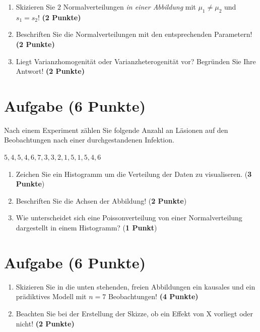 \documentclass[a4paper, 10pt]{scrartcl}\usepackage[]{graphicx}\usepackage[]{color}
\begin{document}
\begin{enumerate}
\item Skizieren Sie $2$ Normalverteilungen \textit{in einer
    Abbildung} mit $\mu_1 \neq \mu_2$ und $s_1 = s_2$! \textbf{(2 Punkte)}
\item Beschriften Sie die Normalverteilungen mit den entsprechenden
  Parametern! \textbf{(2 Punkte)}
\item Liegt Varianzhomogenit{\"a}t oder Varianzheterogenit{\"a}t vor? Begr{\"u}nden Sie
  Ihre Antwort! \textbf{(2 Punkte)}
\end{enumerate}

 
\clearpage

\section{Aufgabe \hfill (6 Punkte)}



Nach einem Experiment zählen Sie folgende Anzahl an Läsionen auf den Beobachtungen nach einer durchgestandenen Infektion. 

\begin{center}
$5, 4, 5, 4, 6, 7, 3, 3, 2, 1, 5, 1, 5, 4, 6$
\end{center}

\begin{enumerate}
\item Zeichen Sie ein Histogramm um die Verteilung der Daten zu visualiseren. (\textbf{3 Punkte})
\item Beschriften Sie die Achsen der Abbildung! (\textbf{2 Punkte})
\item Wie unterscheidet sich eine Poissonverteilung von einer Normalverteilung dargestellt in einem Histogramm? (\textbf{1 Punkt})
\end{enumerate}

 
\clearpage

\section{Aufgabe \hfill (6 Punkte)}



\begin{enumerate}
\item Skizieren Sie in die unten stehenden, freien Abbildungen ein kausales
  und ein pr{\"a}diktives Modell mit $n = 7$
  Beobachtungen! \textbf{(4 Punkte)}
\item Beachten Sie bei der Erstellung der Skizze, ob ein Effekt von X
  vorliegt oder nicht! \textbf{(2 Punkte)}
\end{enumerate}
\end{document}
